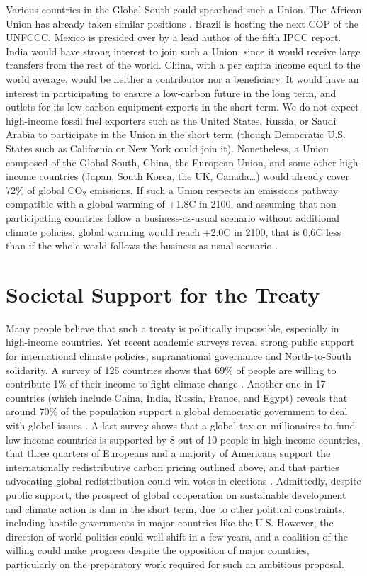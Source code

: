 \documentclass[12pt,english]{article}
\begin{document}
\begin{bibunit}
Various countries in the Global South could spearhead such a Union. The African Union has already taken similar positions \citep{african_union_african_2023}. Brazil is hosting the next COP of the UNFCCC. Mexico is presided over by a lead author of the fifth IPCC report. India would have strong interest to join such a Union, since it would receive large transfers from the rest of the world. China, with a per capita income equal to the world average, would be neither a contributor nor a beneficiary. It would have an interest in participating to ensure a low-carbon future in the long term, and outlets for its low-carbon equipment exports in the short term. We do not expect high-income fossil fuel exporters such as the United States, Russia, or Saudi Arabia to participate in the Union in the short term (though Democratic U.S. States such as California or New York could join it). Nonetheless, a Union composed of the Global South, China, the European Union, and some other high-income countries (Japan, South Korea, the UK, Canada…) would already cover 72\% of global CO$_\text{2}$ emissions. If such a Union respects an emissions pathway compatible with a global warming of +1.8\textdegree{}C in 2100, and assuming that non-participating countries follow a business-as-usual scenario without additional climate policies, global warming would reach +2.0\textdegree{}C in 2100, that is 0.6\textdegree{}C less than if the whole world follows the business-as-usual scenario \citep{fabre_global_2025}.

\section{Societal Support for the Treaty}
Many people believe that such a treaty is politically impossible, especially in high-income countries. Yet recent academic surveys reveal strong public support for international climate policies, supranational governance and North-to-South solidarity. A survey of 125 countries shows that 69\% of people are willing to contribute 1\% of their income to fight climate change \citep{andre_globally_2024}. Another one in 17 countries (which include China, India, Russia, France, and Egypt) reveals that around 70\% of the population support a global democratic government to deal with global issues \citep{ghassim_who_2024}. A last survey shows that a global tax on millionaires to fund low-income countries is supported by 8 out of 10 people in high-income countries, that three quarters of Europeans and a majority of Americans support the internationally redistributive carbon pricing outlined above, and that parties advocating global redistribution could win votes in elections \citep{fabre_majority_2025}. Admittedly, despite public support, the prospect of global cooperation on sustainable development and climate action is dim in the short term, due to other political constraints, including hostile governments in major countries like the U.S. However, the direction of world politics could well shift in a few years, and a coalition of the willing could make progress despite the opposition of major countries, particularly on the preparatory work required for such an ambitious proposal. 


\end{bibunit}
\end{document}
